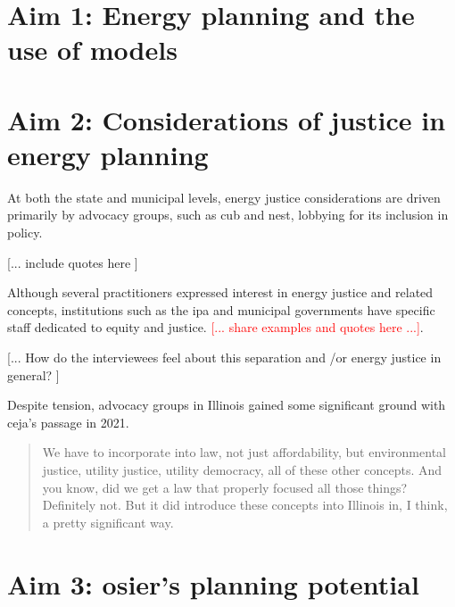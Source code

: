 \section{Aim 1: Energy planning and the use of models}


\section{Aim 2: Considerations of justice in energy planning}

At both the state and municipal levels, energy justice considerations are driven
primarily by advocacy groups, such as \ac{cub} and \ac{nest}, lobbying for its
inclusion in policy. 

[... include quotes here ]

Although several practitioners expressed interest in energy justice and related
concepts, institutions such as the \ac{ipa} and municipal governments have
specific staff dedicated to equity and justice. \textcolor{red}{[... share
examples and quotes here ...]}. 

[... How do the interviewees feel about this separation and /or energy justice
in general? ]

Despite tension, advocacy groups in Illinois gained some significant ground with
\ac{ceja}'s passage in 2021. 

\begin{quotation}
    We have to incorporate into law, not just affordability, but environmental
    justice, utility justice, utility democracy, all of these other concepts.
    And you know, did we get a law that properly focused all those things?
    Definitely not. But it did introduce these concepts into Illinois in, I
    think, a pretty significant way.
\end{quotation}


\section{Aim 3: \ac{osier}'s planning potential}


